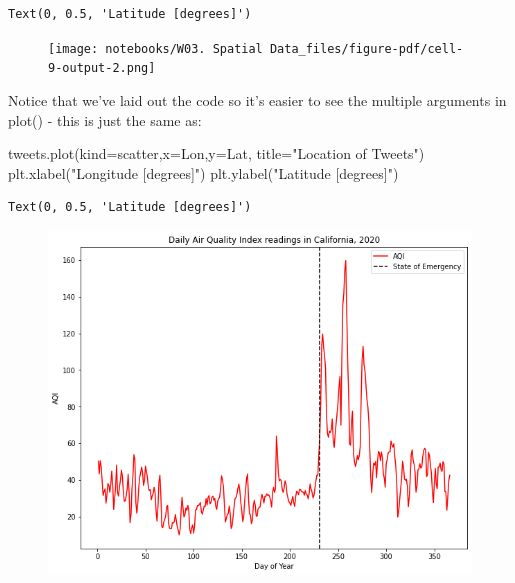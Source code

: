 \documentclass[
  letterpaper,
  DIV=11,
  numbers=noendperiod]{scrreprt}
\newenvironment{Shaded}{\begin{snugshade}}{\end{snugshade}}
\newcommand{\NormalTok}[1]{\textcolor[rgb]{0.00,0.23,0.31}{#1}}
\newcommand{\OperatorTok}[1]{\textcolor[rgb]{0.37,0.37,0.37}{#1}}
\newcommand{\StringTok}[1]{\textcolor[rgb]{0.13,0.47,0.30}{#1}}
\begin{document}
\begin{verbatim}
Text(0, 0.5, 'Latitude [degrees]')
\end{verbatim}

\begin{figure}[H]

{\centering \texttt{[image: notebooks/W03. Spatial Data\_files/figure-pdf/cell-9-output-2.png]}

}

\end{figure}

Notice that we've laid out the code so it's easier to see the multiple
arguments in plot() - this is just the same as:

\begin{Shaded}
\begin{Highlighting}[]
\NormalTok{tweets.plot(kind}\OperatorTok{=}\StringTok{\textquotesingle{}scatter\textquotesingle{}}\NormalTok{,x}\OperatorTok{=}\StringTok{\textquotesingle{}Lon\textquotesingle{}}\NormalTok{,y}\OperatorTok{=}\StringTok{\textquotesingle{}Lat\textquotesingle{}}\NormalTok{, title}\OperatorTok{=}\StringTok{"Location of Tweets"}\NormalTok{)}
\NormalTok{plt.xlabel(}\StringTok{"Longitude [degrees]"}\NormalTok{)}
\NormalTok{plt.ylabel(}\StringTok{"Latitude [degrees]"}\NormalTok{)}
\end{Highlighting}
\end{Shaded}

\begin{verbatim}
Text(0, 0.5, 'Latitude [degrees]')
\end{verbatim}

\begin{figure}[H]

{\centering \includegraphics{notebooks/W03. Spatial Data_files/figure-pdf/cell-10-output-2.png}

}

\end{figure}
\end{document}
